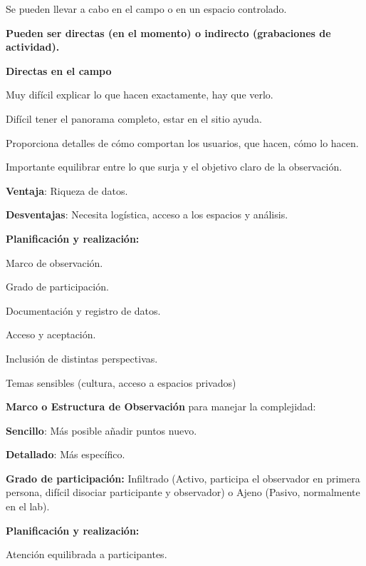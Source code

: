 \documentclass[12pt]{report} %
\begin{document}
Se pueden llevar a cabo en el campo o en un espacio controlado.

\textbf{Pueden ser directas (en el momento) o indirecto (grabaciones de
actividad).}

\textbf{Directas en el campo}

Muy difícil explicar lo que hacen exactamente, hay que verlo.

Difícil tener el panorama completo, estar en el sitio ayuda.

Proporciona detalles de cómo comportan los usuarios, que hacen, cómo lo
hacen.

Importante equilibrar entre lo que surja y el objetivo claro de la
observación.

\textbf{Ventaja}: Riqueza de datos.

\textbf{Desventajas}: Necesita logística, acceso a los espacios y
análisis.

\textbf{Planificación y realización:}

\hspace{0pt} Marco de observación.

\hspace{0pt} Grado de participación.

\hspace{0pt} Documentación y registro de datos.

\hspace{0pt} Acceso y aceptación.

\hspace{0pt} Inclusión de distintas perspectivas.

\hspace{0pt} Temas sensibles (cultura, acceso a espacios privados)

\textbf{Marco o Estructura de Observación} para manejar la complejidad:

\hspace{0pt} \textbf{Sencillo}: Más posible añadir puntos nuevo.

\hspace{0pt} \textbf{Detallado}: Más específico.

\textbf{Grado de participación:} Infiltrado (Activo, participa el
observador en primera persona, difícil disociar participante y
observador) o Ajeno (Pasivo, normalmente en el lab).

\textbf{Planificación y realización:}

\hspace{0pt} Atención equilibrada a participantes.
\end{document}
